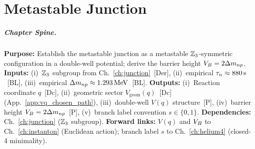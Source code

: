 
\chapter{Metastable Junction}
\label{ch:metastable}


\begin{abstract}
The metastable junction decays with a measured lifetime of $\taun \approx 880\second$~[BL].
Why this value? In EDC, the metastable junction is a \emph{metastable configuration} within
the same junction space as the anchor junction---a local minimum of the 5D energy functional
separated from the ground state by an energy barrier. This chapter establishes
the geometric framework: the reaction coordinate $q$, the double-well potential
$V(q)$, and the barrier height conjecture $\VB = 2 \times \Delta m_{np}$.
\end{abstract}

\paragraph{Chapter Spine.}
\textbf{Purpose:} Establish the metastable junction as a metastable $\mathbb{Z}_3$-symmetric
configuration in a double-well potential; derive the barrier height $V_B = 2\Delta m_{np}$.
\textbf{Inputs:} (i)~$\mathbb{Z}_3$ subgroup from Ch.~\ref{ch:junction}~[Der],
(ii)~empirical $\taun \approx 880\second$~[BL], (iii)~empirical $\Delta m_{np} \approx 1.293\,\mathrm{MeV}$~[BL].
\textbf{Outputs:} (i)~Reaction coordinate $q$~[Dc], (ii)~geometric sector
$V_{\mathrm{geom}}(q)$~[Dc] (App.~\ref{app:vq_chosen_path}),
(iii)~double-well $V(q)$ structure~[P],
(iv)~barrier height $V_B = 2\Delta m_{np}$~[P], (v)~branch label convention $s \in \{0,1\}$.
\textbf{Dependencies:} Ch.~\ref{ch:junction} ($\mathbb{Z}_3$ subgroup).
\textbf{Forward links:} $V(q)$ and $V_B$ to Ch.~\ref{ch:instanton} (Euclidean action);
branch label $s$ to Ch.~\ref{ch:helium4} (closed-4 minimality).

